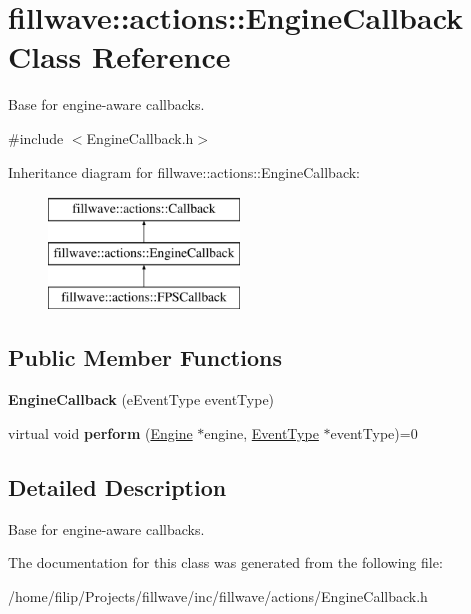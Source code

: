 \hypertarget{classfillwave_1_1actions_1_1EngineCallback}{}\section{fillwave\+:\+:actions\+:\+:Engine\+Callback Class Reference}
\label{classfillwave_1_1actions_1_1EngineCallback}


Base for engine-\/aware callbacks.  




{\ttfamily \#include $<$Engine\+Callback.\+h$>$}

Inheritance diagram for fillwave\+:\+:actions\+:\+:Engine\+Callback\+:\begin{figure}[H]
\begin{center}
\leavevmode
\includegraphics[height=3.000000cm]{classfillwave_1_1actions_1_1EngineCallback}
\end{center}
\end{figure}
\subsection*{Public Member Functions}
\begin{DoxyCompactItemize}
\item 
\hypertarget{classfillwave_1_1actions_1_1EngineCallback_acf1ee572444c1c6d8d78566c05b66b83}{}{\bfseries Engine\+Callback} (e\+Event\+Type event\+Type)\label{classfillwave_1_1actions_1_1EngineCallback_acf1ee572444c1c6d8d78566c05b66b83}

\item 
\hypertarget{classfillwave_1_1actions_1_1EngineCallback_a0699b0bc6f2d598b0192c1f8e486483a}{}virtual void {\bfseries perform} (\hyperlink{classfillwave_1_1Engine}{Engine} $\ast$engine, \hyperlink{classfillwave_1_1actions_1_1EventType}{Event\+Type} $\ast$event\+Type)=0\label{classfillwave_1_1actions_1_1EngineCallback_a0699b0bc6f2d598b0192c1f8e486483a}

\end{DoxyCompactItemize}


\subsection{Detailed Description}
Base for engine-\/aware callbacks. 

The documentation for this class was generated from the following file\+:\begin{DoxyCompactItemize}
\item 
/home/filip/\+Projects/fillwave/inc/fillwave/actions/Engine\+Callback.\+h\end{DoxyCompactItemize}
